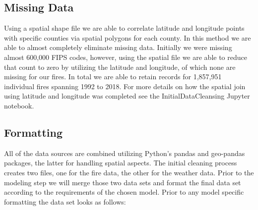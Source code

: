 \documentclass[12pt]{article}
\begin{document}
\subsection{\textrm{Missing Data}}

Using a spatial shape file we are able to correlate latitude and longitude points with specific counties via spatial polygons for each county. In this method we are able to almost completely eliminate missing data. Initially we were missing almost 600,000 FIPS codes, however, using the spatial file we are able to reduce that count to zero by utilizing the latitude and longitude, of which none are missing for our fires. In total we are able to retain records for 1,857,951 individual fires spanning 1992 to 2018. For more details on how the spatial join using latitude and longitude was completed see the InitialDataCleansing Jupyter notebook. 

\subsection{\textrm{Formatting}} 

All of the data sources are combined utilizing Python's pandas and geo-pandas packages, the latter for handling spatial aspects. The initial cleaning process creates two files, one for the fire data, the other for the weather data. Prior to the modeling step we will merge those two data sets and format the final data set according to the requirements of the chosen model. Prior to any model specific formatting the data set looks as follows: \\
\end{document}
